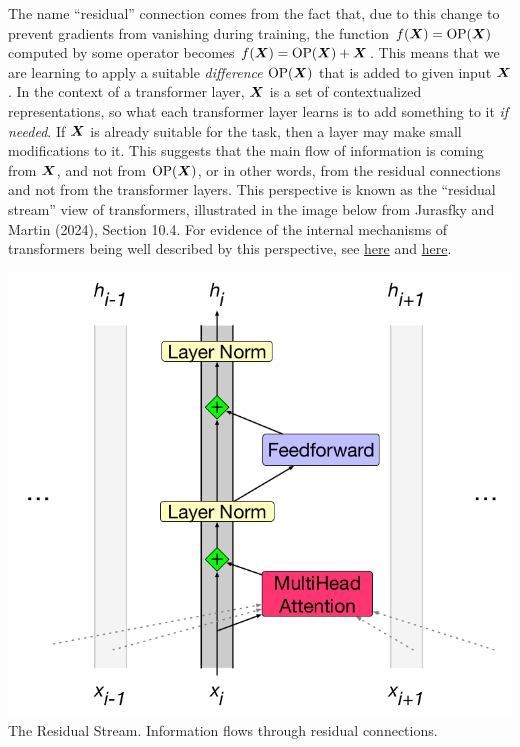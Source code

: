 \documentclass[11pt,a4paper]{article}
\newcommand\op[1]{\operatorname{#1}}
\begin{document}
\begin{enumerate}[label=(\alph*)]
          The name ``residual'' connection comes from the fact that, due to this
          change to prevent gradients from vanishing during training, the
          function $f(\mX) = \op{OP}(\mX)$ computed by some operator becomes
          $f(\mX) = \op{OP}(\mX) + \mX$.
          This means that we are learning to apply a suitable \emph{difference}
          $\op{OP}(\mX)$ that is added to given input ${\boldsymbol{X}}$.
          In the context of a transformer layer, ${\boldsymbol{X}}$ is a set of
          contextualized representations, so what each transformer layer learns
          is to add something to it \emph{if needed}.
          If ${\boldsymbol{X}}$ is already suitable for the task, then a layer may make small
          modifications to it.
          This suggests that the main flow of information is coming from ${\boldsymbol{X}}$,
          and not from $\op{OP}(\mX)$, or in other words, from the residual
          connections and not from the transformer layers.
          This perspective is known as the ``residual stream'' view of
          transformers, illustrated in the image below from Jurasfky and Martin
          (2024), Section 10.4.
          For evidence of the internal mechanisms of transformers being well 
          described by this perspective, see 
          \href{https://www.lesswrong.com/posts/AcKRB8wDpdaN6v6ru/interpreting-gpt-the-logit-lens}{here} 
          and \href{https://aclanthology.org/2022.emnlp-main.3/}{here}.
\end{enumerate}
\begin{center}
    \includegraphics[scale=0.3]{img/residual_stream.png}
    \\ The Residual Stream. Information flows through residual connections.
\end{center}
\end{document}
